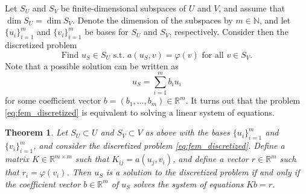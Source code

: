 \documentclass[english, 12pt, a4paper, sci, utf8, a-2b, online]{aaltothesis}
\theoremstyle{definition}
\theoremstyle{plain}
\newtheorem{theorem}{Theorem}[section]
\numberwithin{equation}{section}
\begin{document}
Let $S_U$ and $S_V$ be finite-dimensional subspaces of $U$ and $V$, and
assume that $\dim S_U = \dim S_V$.
Denote the dimension of the subspaces by $m \in \mathbb{N}$,
and let $\{ u_i \}_{i=1}^{m}$ and $\{ v_i \}_{i=1}^{m}$ be bases for
$S_U$ and $S_V$, respectively. Consider then the discretized problem
\begin{equation}
    \label{eq:fem_discretized}
    \text{Find } u_S \in S_U \text{ s.t.\ }
    a(u_S,v) = \varphi(v) \text{ for all } v \in S_V.
\end{equation}
Note that a possible solution can be written as
\begin{equation}
    \label{eq:uS_wrt_basis}
    u_S = \sum_{i=1}^{m} b_i u_i
\end{equation}
for some coefficient vector $b = (b_1,\dotsc,b_m) \in \mathbb{R}^m$.
It turns out that the problem \eqref{eq:fem_discretized} is equivalent
to solving a linear system of equations.
\begin{theorem}
    \label{thm:discretized_problem_solution_equivalence}
    Let $S_U \subset U$ and $S_V \subset V$ as above with the bases
    $\{ u_i \}_{i=1}^{m}$ and $\{ v_i \}_{i=1}^{m}$,
    and consider the discretized problem \eqref{eq:fem_discretized}.
    Define a matrix $K \in \mathbb{R}^{m \times m}$ such that
    $K_{ij} = a(u_j,v_i)$, and define a vector $r \in \mathbb{R}^m$
    such that $r_i = \varphi(v_i)$. Then $u_S$ is a solution
    to the discretized problem
    if and only if the coefficient vector $b \in \mathbb{R}^m$ of $u_S$ solves the system
    of equations $Kb = r$.
\end{theorem}
\end{document}
